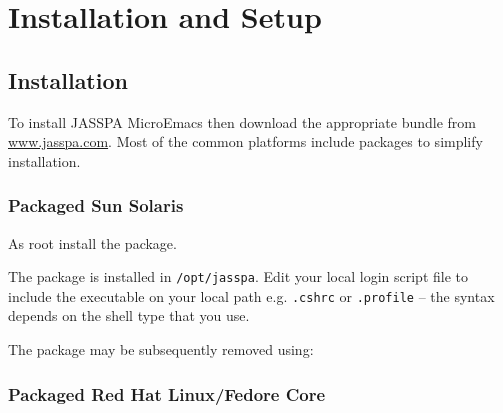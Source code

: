 \documentclass[11pt,a4paper,pdftex]{article}
\begin{document}
\setlength{\parindent}{0pt}
\setlength{\parskip}{0.5ex}

\section{Installation and Setup}

\subsection{Installation}

To install JASSPA MicroEmacs then download the appropriate bundle from
\href{http://www.jasspa.com}{www.jasspa.com}. Most of the common platforms
include packages to simplify installation.

\subsubsection{Packaged Sun Solaris}

  As root install the package.


  The package is installed in \texttt{/opt/jasspa}. Edit your local login
  script file to include the executable on your local path e.g.
  \texttt{.cshrc} or \texttt{.profile} -- the syntax depends on the shell type
  that you use.


  The package may be subsequently removed using:


\subsubsection{Packaged Red Hat Linux/Fedore Core}
\end{document}
